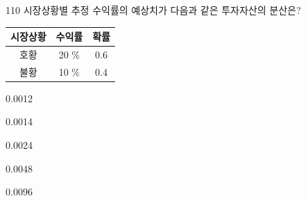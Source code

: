 \begin{question}{110}
시장상황별 추정 수익률의 예상치가 다음과 같은 투자자산의 분산은?
\par{\small\centering
\begin{tabular}{|c|c|c|}\hline
시장상황 & 수익률 & 확률 \\ \hline
호황 & 20 \% & 0.6 \\ \hline
불황 & 10 \% & 0.4 \\ \hline
\end{tabular}\par}
\begin{choices}
  \item 0.0012
  \item 0.0014
  \item 0.0024
  \item 0.0048
  \item 0.0096
\end{choices}
\end{question}
